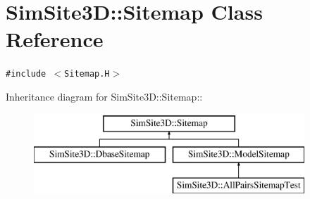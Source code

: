 \section{SimSite3D::Sitemap Class Reference}
\label{classSimSite3D_1_1Sitemap}
{\tt \#include $<$Sitemap.H$>$}

Inheritance diagram for SimSite3D::Sitemap::\begin{figure}[H]
\begin{center}
\leavevmode
\includegraphics[height=3cm]{classSimSite3D_1_1Sitemap}
\end{center}
\end{figure}
